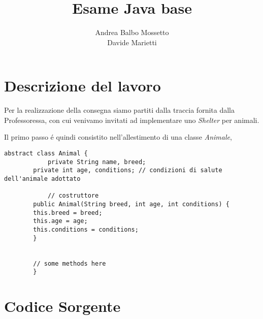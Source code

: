 \documentclass{article}
\title{Esame Java base}
\author{Andrea Balbo Mossetto \\ Davide Marietti}
\date{}
\begin{document}
	\maketitle
	\newpage
	
	\tableofcontents
	\newpage
	
	\lstlistoflistings
	\newpage
	
	
	\section{Descrizione del lavoro}
	
	Per la realizzazione della consegna siamo partiti dalla traccia fornita dalla Professoressa, con cui venivamo invitati ad implementare uno \textit{Shelter} per animali. 
	
	Il primo passo \'e quindi consistito nell'allestimento di una classe \textit{Animale}, 
	
	\begin{lstlisting}[caption={Allestimento della classe Animale}]
		abstract class Animal {
		 	private String name, breed;
   		private int age, conditions; // condizioni di salute dell'animale adottato

			// costruttore
   		public Animal(String breed, int age, int conditions) {
      	this.breed = breed;
      	this.age = age;
      	this.conditions = conditions;
   		}

		
		// some methods here 
		}
	\end{lstlisting}
	
	
	\newpage
	
	\appendix
	\section{Codice Sorgente}
	
\end{document}
